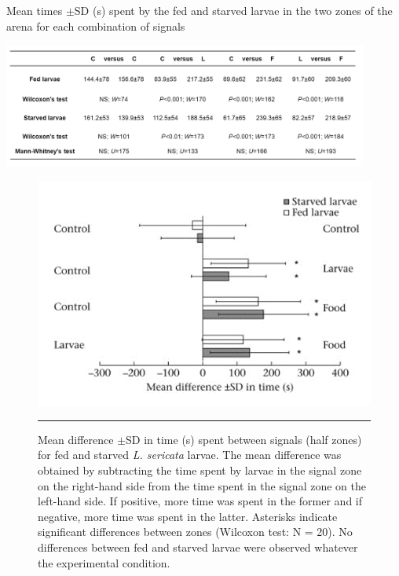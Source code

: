\begin{table}[p]
	\centering
    \caption[Table]{Mean times $\pm$SD (s) spent by the fed and starved larvae in the two zones of the arena for each combination of signals}
    \includegraphics[width=0.9\textwidth]{Figures/table.png}
    \label{tab:table}
\end{table}

\begin{figure}[p]
	\centering
    \includegraphics[width=0.9 \textwidth]{Figures/duree.png}
    \rule{35em}{0.5pt}
    \caption{Mean difference $\pm$SD in time (s) spent between signals (half zones) for fed and starved \textit{L. sericata} larvae. The mean difference was obtained by subtracting the time spent by larvae in the signal zone on the right-hand side from the time spent in the signal zone on the left-hand side. If positive, more time was spent in the former and if negative, more time was spent in the latter. Asterisks indicate significant differences between zones (Wilcoxon test: N = 20). No differences between fed and starved larvae were observed whatever the experimental condition.}
    \label{fig:duree}   

\end{figure}

